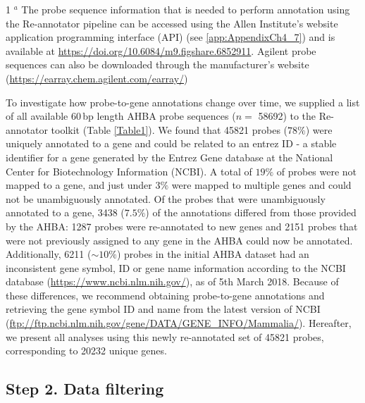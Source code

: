 \begin{table}[h!]
{\begin{tabular}{ll}
\end{tabular}}
\begin{tablenotes}
     \item[1] $^{a}$ The probe sequence information that is needed to perform annotation using the Re-annotator pipeline can be accessed using the Allen Institute’s website application programming interface (API) (see \ref{app:AppendixCh4_7}) and is available at \url{https://doi.org/10.6084/m9.figshare.6852911}. Agilent probe sequences can also be downloaded  through the manufacturer's website (\url{https://earray.chem.agilent.com/earray/})
   \end{tablenotes}
\end{table}

To investigate how probe-to-gene annotations change over time, we supplied a list of all available $60$\,bp length AHBA probe sequences ($n =$ \num{58692}) to the Re-annotator toolkit \citep{Arloth2015} (Table \ref{Table1}). We found that \num{45821} probes ($78\%$) were uniquely annotated to a gene and could be related to an entrez ID - a stable identifier for a gene generated by the Entrez Gene database at the National Center for Biotechnology Information (NCBI). A total of $19\%$ of probes were not mapped to a gene, and just under $3\%$ were mapped to multiple genes and could not be unambiguously annotated. Of the probes that were unambiguously annotated to a gene, \num{3438} ($7.5\%$) of the annotations differed from those provided by the AHBA: \num{1287} probes were re-annotated to new genes and \num{2151} probes that were not previously assigned to any gene in the AHBA could now be annotated. Additionally, \num{6211} ($\sim10\%$) probes in the initial AHBA dataset had an inconsistent gene symbol, ID or gene name information according to the NCBI database (\url{https://www.ncbi.nlm.nih.gov/}), as of 5th March 2018. Because of these differences, we recommend obtaining probe-to-gene annotations and retrieving the gene symbol ID and name from the latest version of NCBI (\url{ftp://ftp.ncbi.nlm.nih.gov/gene/DATA/GENE_INFO/Mammalia/}). Hereafter, we present all analyses using this newly re-annotated set of \num{45821} probes, corresponding to \num{20232} unique genes.

\subsection{Step 2. Data filtering}

